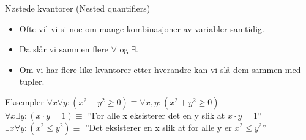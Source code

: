 \begin{frame}{Nøstede kvantorer (Nested quantifiers)}
    \begin{itemize}
        \item Ofte vil vi si noe om mange kombinasjoner av variabler samtidig.
        \item Da slår vi sammen flere $\forall$ og $\exists$.
        \item Om vi har flere like kvantorer etter hverandre kan vi slå dem sammen med tupler.
    \end{itemize}
    
    \pause
    \begin{block}{Eksempler}
        $\forall x \forall y : (x^2 + y^2 \geq 0) \equiv \forall x, y : (x^2 + y^2 \geq 0)$ \\
        \pause
        $\forall x \exists y : (x \cdot y = 1) \equiv$ ''For alle x eksisterer det en y slik at $x \cdot y = 1$'' \\
        \pause
        $\exists x \forall y : (x^2 \leq y^2) \equiv$ ''Det eksisterer en x slik at for alle y er $x^2 \leq y^2$''\\
    \end{block}
\end{frame}

